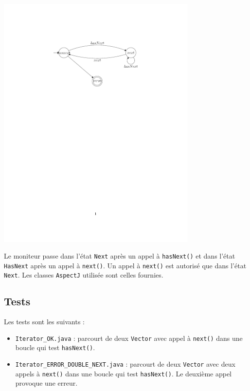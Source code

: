 \documentclass{article}
\begin{document}
\begin{center}
\includegraphics[width=10cm, clip, trim=5.5cm 18cm 5.5cm
4cm]{iterator.pdf}
\end{center}

Le moniteur passe dans l'état \texttt{Next} après un appel à \texttt{hasNext()}
et dans l'état \texttt{HasNext} après un appel à \texttt{next()}. Un appel à
\texttt{next()} est autorisé que dans l'état \texttt{Next}. Les classes
\texttt{AspectJ} utilisée sont celles fournies.

\subsection{Tests}

Les tests sont les suivants :

\begin{itemize}
  \item \texttt{Iterator\_OK.java} : parcourt de deux \texttt{Vector} avec appel
  à \texttt{next()} dans une boucle qui test \texttt{hasNext()}.
  \item \texttt{Iterator\_ERROR\_DOUBLE\_NEXT.java} : parcourt de deux
  \texttt{Vector} avec deux appels à \texttt{next()} dans une boucle qui test
  \texttt{hasNext()}. Le deuxième appel provoque une erreur.
\end{itemize}
\end{document}
